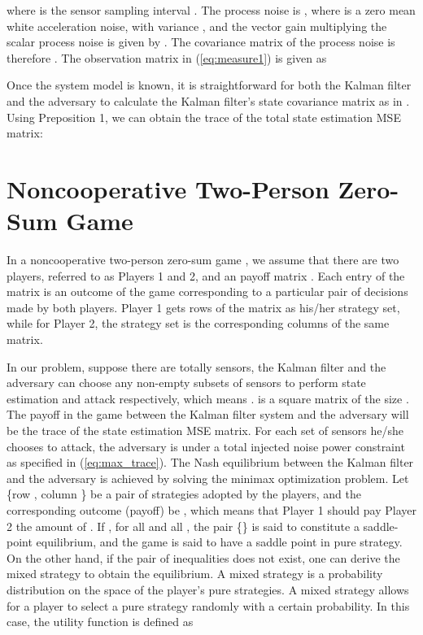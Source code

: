 \documentclass{article}
\begin{document}
where  is the sensor sampling  interval . The process noise is , where  is a zero mean white acceleration noise, with variance , and the vector gain multiplying the scalar process noise is given by .
The covariance matrix of the process noise is therefore . 
The observation matrix in (\ref{eq:measure1}) is given as 
 
Once the system model is known, it is straightforward for both the Kalman filter and the adversary to calculate the Kalman filter's state  covariance matrix  as in \cite{YBS:book}. Using Preposition 1, we can obtain the trace of the total state estimation MSE matrix:
 

\section{Noncooperative Two-Person Zero-Sum Game}

In a noncooperative two-person zero-sum game \cite{basar&olsder:book}, we assume that there are two players, referred to as Players 1 and  2, and an   payoff matrix . Each entry of the matrix is an outcome of the game corresponding to a particular pair of decisions made by both players. Player 1 gets  rows of the matrix as his/her strategy set, while for Player 2, the strategy set is the corresponding  columns of the same matrix.
 
In our problem, suppose there are totally  sensors, the Kalman filter and the adversary can choose any non-empty subsets of sensors to perform state estimation and attack respectively, which means .  is a square matrix of the size . The payoff in the game between the Kalman filter system and the adversary will be the trace of the state estimation MSE matrix. For each set of sensors he/she chooses to attack,  the adversary is under a total injected noise power  constraint as  specified  in (\ref{eq:max_trace}). The Nash equilibrium between the Kalman filter and the adversary is achieved by solving the minimax optimization problem. 
Let \{row , column \} be a pair of strategies adopted by the players, and the corresponding outcome (payoff) be , which means that Player 1 should pay Player 2 the amount of . If , for all  and all , the pair \{\} is  said to constitute a saddle-point equilibrium, and the game is said to have a saddle point in pure strategy. On the other hand,  if the pair of inequalities does not  exist, one can derive the mixed strategy to obtain the equilibrium. A mixed strategy is a probability distribution on the space of the player's pure strategies. A mixed strategy allows for a player to select a pure strategy randomly with a certain probability. In this case, the utility function  is defined as
\end{document}
